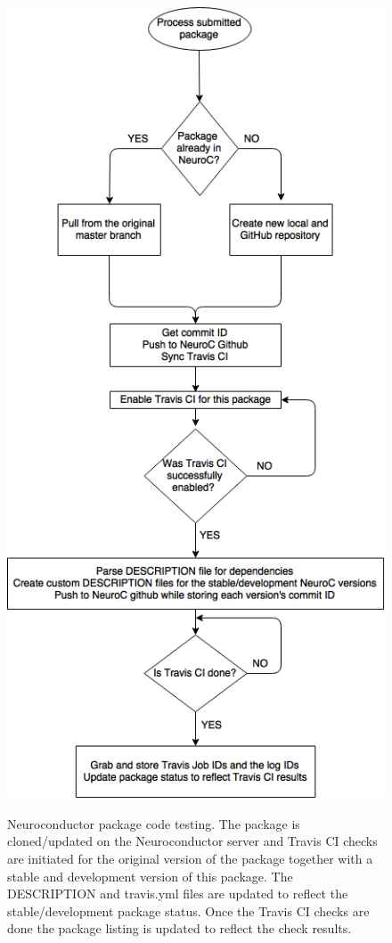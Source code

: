\documentclass[]{elsarticle} %
\begin{document}
\begin{figure}[!ht]
  \begin{center}
    \caption{Neuroconductor package code testing. The package is cloned/updated on the Neuroconductor server and Travis CI checks are initiated for the original version of the package together with a stable and development version of this package. The DESCRIPTION and travis.yml files are updated to reflect the stable/development package status. Once the Travis CI checks are done the package listing is updated to reflect the check results.}
    \label{fig:stage2}
    \includegraphics[height=0.9\textheight]{figures/flow_stage2_draft.png}\label{fig:package_lifetime_2}
  \end{center}
\end{figure}
\end{document}
